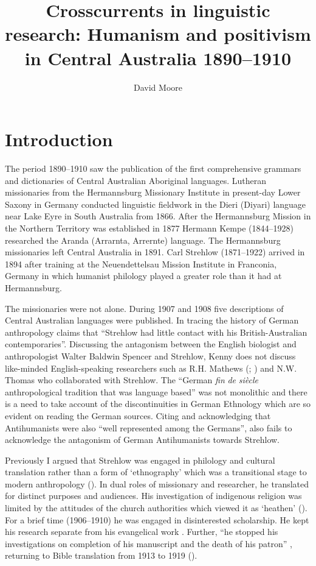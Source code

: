 \documentclass[english,output=paper,colorlinks,citecolor=brown]{../langscibook}
\author{David Moore\affiliation{University of Western Australia}\orcid{}}
\title{Crosscurrents in linguistic research: Humanism and positivism in Central Australia 1890--1910}
\begin{document}
\maketitle

\section{Introduction} 

 The period 1890--1910 saw the publication of the first comprehensive grammars and dictionaries of Central  Australian Aboriginal languages. Lutheran missionaries from the Hermannsburg Missionary Institute in present-day Lower Saxony in Germany conducted linguistic fieldwork in the Dieri (Diyari) language near Lake Eyre in South Australia from 1866. After the Hermannsburg Mission in the Northern Territory was established in 1877 Hermann Kempe (1844--1928) researched the Aranda (Arrarnta, Arrernte) language. The Hermannsburg missionaries left Central Australia in 1891. Carl Strehlow (1871--1922) arrived in 1894 after training at the Neuendettelsau Mission Institute in Franconia, Germany in which humanist philology played a greater role than it had at Hermannsburg.
 
 The missionaries were not alone. During 1907 and 1908 five descriptions of Central Australian languages were published. In tracing the history of German anthropology \citet[51]{Kenny2013} claims that “Strehlow had little contact with his British-Australian contemporaries”. Discussing the antagonism between the English biologist and anthropologist Walter Baldwin Spencer and Strehlow, Kenny does not discuss like-minded English-speaking researchers such as R.H. Mathews (\citealt{Mathews1907}; \citealt{Thomas2007}) and N.W. Thomas who collaborated with Strehlow. The “German \textit{fin} \textit{de} \textit{siècle} anthropological tradition that was language based” \citep[99]{Kenny2013} was not monolithic and there is a need to take account of the discontinuities in German Ethnology which are so evident on reading the German sources. Citing \citet{Monteath2013} and acknowledging that Antihumanists were also “well represented among the Germans”, \citet[228]{Kenny2013} also fails to acknowledge the antagonism of German Antihumanists towards Strehlow.
 
 Previously I argued that Strehlow was engaged in philology and cultural translation rather than a form of ‘ethnography’ which was a transitional stage to modern anthropology (\citealt[336]{MooreRíos-Castaño2018}). In dual roles of missionary and researcher, he translated for distinct purposes and audiences. His investigation of indigenous religion was limited by the attitudes of the church authorities which viewed it as ‘heathen’ (\citealt[338]{MooreRíos-Castaño2018}).  For a brief time (1906--1910) he was engaged in disinterested scholarship. He kept his research separate from his evangelical work \citep[232]{Brock2017}. Further, “he stopped his investigations on completion of his manuscript and the death of his patron” \citep[236]{Brock2017}, returning to Bible translation from 1913 to 1919 (\citealt[336]{MooreRíos-Castaño2018}).
 
\end{document}
